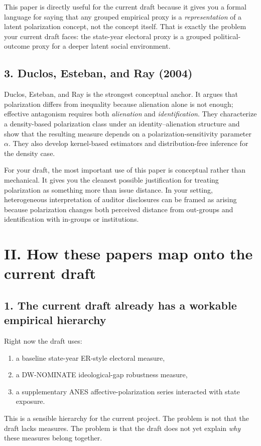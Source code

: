 \documentclass[12pt]{article}
\begin{document}
This paper is directly useful for the current draft because it gives you a formal language for saying that any grouped empirical proxy is a \emph{representation} of a latent polarization concept, not the concept itself. That is exactly the problem your current draft faces: the state-year electoral proxy is a grouped political-outcome proxy for a deeper latent social environment.

\subsection*{3. Duclos, Esteban, and Ray (2004)}
Duclos, Esteban, and Ray is the strongest conceptual anchor. It argues that polarization differs from inequality because alienation alone is not enough; effective antagonism requires both \emph{alienation} and \emph{identification}. They characterize a density-based polarization class under an identity--alienation structure and show that the resulting measure depends on a polarization-sensitivity parameter $\alpha$. They also develop kernel-based estimators and distribution-free inference for the density case.

For your draft, the most important use of this paper is conceptual rather than mechanical. It gives you the cleanest possible justification for treating polarization as something more than issue distance. In your setting, heterogeneous interpretation of auditor disclosures can be framed as arising because polarization changes both perceived distance from out-groups and identification with in-groups or institutions.

\section*{II. How these papers map onto the current draft}

\subsection*{1. The current draft already has a workable empirical hierarchy}
Right now the draft uses:
\begin{enumerate}[label=\alph*.]
    \item a baseline state-year ER-style electoral measure,
    \item a DW-NOMINATE ideological-gap robustness measure,
    \item a supplementary ANES affective-polarization series interacted with state exposure.
\end{enumerate}
This is a sensible hierarchy for the current project. The problem is not that the draft lacks measures. The problem is that the draft does not yet explain \emph{why} these measures belong together.
\end{document}

